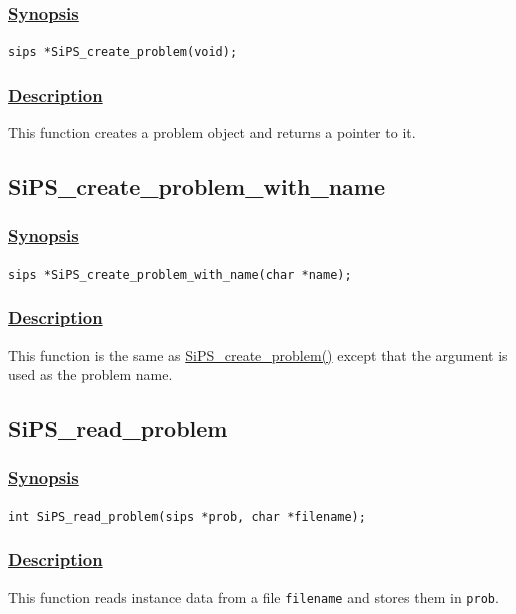 \documentclass[a4paper]{book}
\begin{document}
\subsubsection{\underline{Synopsis}}

\verb+sips *SiPS_create_problem(void);+

\subsubsection{\underline{Description}}

This function creates a problem object and returns a pointer to it.


\hypertarget{SiPS_create_problem_with_name}{%
\subsection{SiPS\_create\_problem\_with\_name}
}

\subsubsection{\underline{Synopsis}}

\verb+sips *SiPS_create_problem_with_name(char *name);+

\subsubsection{\underline{Description}}

This function is the same as \hyperlink{SiPS_create_problem}{SiPS\_create\_problem()} except that the argument is used as the problem name.

\hypertarget{SiPS_read_problem}{%
\subsection{SiPS\_read\_problem}
}

\subsubsection{\underline{Synopsis}}

\verb+int SiPS_read_problem(sips *prob, char *filename);+

\subsubsection{\underline{Description}}

This function reads instance data from a file \verb+filename+ and stores them in \verb+prob+.
\end{document}
